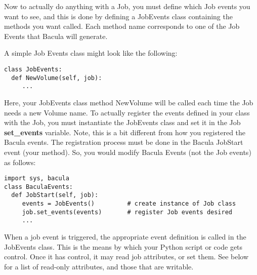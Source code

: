 Now to actually do anything with a Job, you must define which Job events
you want to see, and this is done by defining a JobEvents class containing
the methods you want called.  Each method name corresponds to one of the
Job Events that Bacula will generate.

A simple Job Events class might look like the following:

\footnotesize
\begin{verbatim}
class JobEvents:
  def NewVolume(self, job):
     ...
\end{verbatim}
\normalsize

Here, your JobEvents class method NewVolume will be called each time
the Job needs a new Volume name.  To actually register the events defined
in your class with the Job, you must instantiate the JobEvents class and
set it in the Job {\bf set\_events} variable. Note, this is a bit different 
from how you registered the Bacula events. The registration process must
be done in the Bacula JobStart event (your method).  So, you would modify 
Bacula Events (not the Job events) as follows:

\footnotesize
\begin{verbatim}
import sys, bacula
class BaculaEvents:
  def JobStart(self, job):
     events = JobEvents()         # create instance of Job class
     job.set_events(events)       # register Job events desired
     ...
\end{verbatim}
\normalsize

When a job event is triggered, the appropriate event definition is
called in the JobEvents class. This is the means by which your Python
script or code gets control. Once it has control, it may read job
attributes, or set them. See below for a list of read-only attributes,
and those that are writable.  

